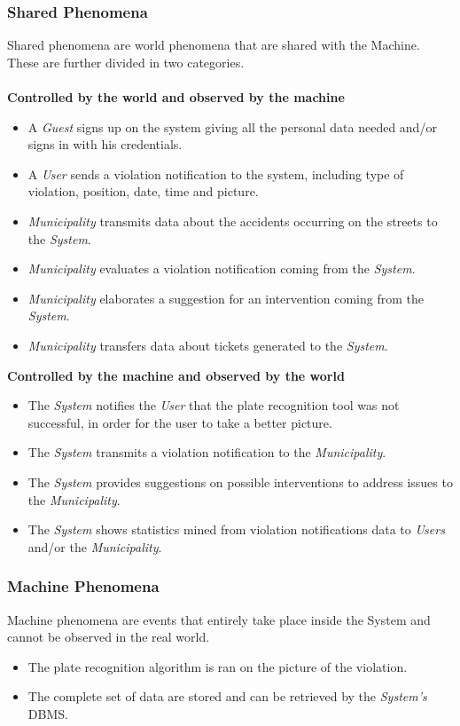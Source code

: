 \documentclass {article}
\begin{document}
		\subsubsection{Shared Phenomena}
		Shared phenomena are world phenomena that are shared with the Machine. These are further divided in two categories.\\ \\
		{\bf Controlled by the world and observed by the machine}
		\begin{itemize}
			\item A {\it Guest} signs up on the system giving all the personal data needed and/or signs in with his credentials.
			\item A {\it User} sends a violation notification to the system, including type of violation, position, date, time and picture.
			\item {\it Municipality} transmits data about the accidents occurring on the streets to the {\it System}.
			\item {\it Municipality} evaluates a violation notification coming from the {\it System}. 
			\item {\it Municipality} elaborates a suggestion for an intervention coming from the {\it System}. 
			\item {\it Municipality} transfers data about tickets generated to the {\it System}.
		\end{itemize} 
		{\bf Controlled by the machine and observed by the world}
		\begin{itemize}
			\item The {\it System} notifies the {\it User} that the plate recognition tool was not successful, in order for the user to take a better picture.
			\item The {\it System} transmits a violation notification to the {\it Municipality}.
			\item The {\it System} provides suggestions on possible interventions to address issues to the {\it Municipality}.
			\item The {\it System} shows statistics mined from violation notifications data to {\it Users} and/or the {\it Municipality}.
		\end{itemize}	
		\subsubsection{Machine Phenomena}
		Machine phenomena are events that entirely take place inside the System and cannot be observed in the real world.
		\begin{itemize}
			\item The plate recognition algorithm is ran on the picture of the violation.
			\item The complete set of data are stored and can be retrieved by the {\it System's} DBMS.
		\end{itemize}
\end{document}
